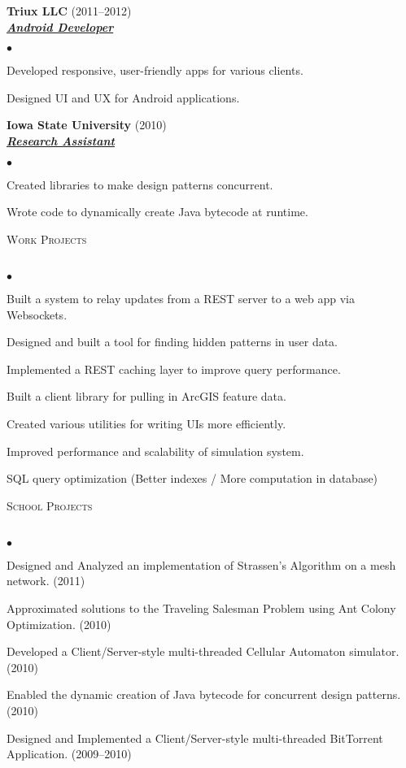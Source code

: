 \documentclass{article}
\newcommand{\lineunder} {
	\vspace*{-8pt} \\ \hspace*{-18pt} \hrulefill \\
}
\newcommand{\header}[1] {
	{\hspace*{-15pt}\vspace*{6pt} \textsc{#1}} \vspace*{-6pt} \lineunder
}
\newcommand{\employer}[3] {
	{ \textbf{#1} (#2)\\ \underline{\textbf{\emph{#3}}}\\  }
}
\newenvironment{achievements} {
	\begin{list}{$\bullet$}
		{\topsep 0pt \itemsep -2pt}
	}{
		\vspace*{4pt}\end{list}
	}
\begin{document}
	\employer{Triux LLC}{2011--2012}{Android Developer}
		\begin{achievements}
			\item{Developed responsive, user-friendly apps for various clients.}
			\item{Designed UI and UX for Android applications.}
		\end{achievements}

	\employer{Iowa State University}{2010}{Research Assistant}
		\begin{achievements}
			\item{Created libraries to make design patterns concurrent.}
			\item{Wrote code to dynamically create Java bytecode at runtime.}
		\end{achievements}


\header{Work Projects}

	\begin{achievements}
      \item{Built a system to relay updates from a REST server to a web app via Websockets.}
      \item{Designed and built a tool for finding hidden patterns in user data.}
      \item{Implemented a REST caching layer to improve query performance.}
      \item{Built a client library for pulling in ArcGIS feature data.}
      \item{Created various utilities for writing UIs more efficiently.}
      \item{Improved performance and scalability of simulation system.}
      \item{SQL query optimization (Better indexes / More computation in database)}
   \end{achievements}

\header{School Projects}

   \begin{achievements}
       \item{Designed and Analyzed an implementation of Strassen's Algorithm on a mesh network. (2011)}
       \item{Approximated solutions to the Traveling Salesman Problem using Ant Colony Optimization. (2010)}
       \item{Developed a Client/Server-style multi-threaded Cellular Automaton simulator. (2010)}
       \item{Enabled the dynamic creation of Java bytecode for concurrent design patterns. (2010)}
       \item{Designed and Implemented a Client/Server-style multi-threaded BitTorrent Application. (2009--2010)}
   \end{achievements}
\end{document}
